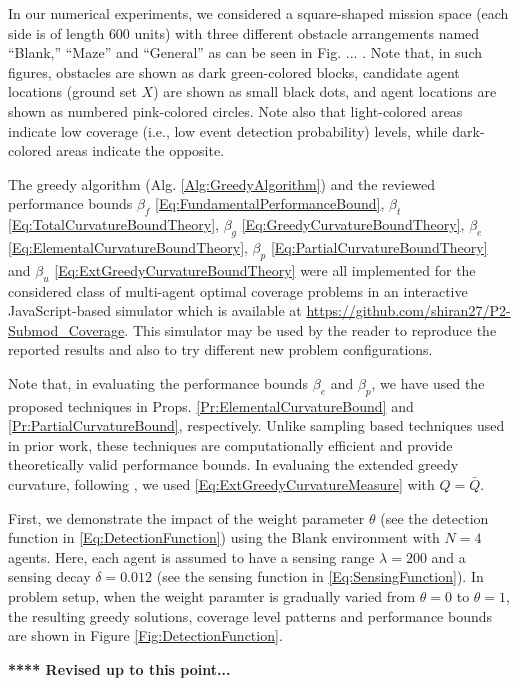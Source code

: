 \documentclass[letterpaper, 10 pt, conference]{ieeeconf}
\begin{document}
In our numerical experiments, we considered a square-shaped mission space (each side is of length $600$ units) with three different obstacle arrangements named ``Blank,'' ``Maze'' and ``General'' as can be seen in Fig. ... . Note that, in such figures, obstacles are shown as dark green-colored blocks, candidate agent locations (ground set $X$) are shown as small black dots, and agent locations are shown as numbered pink-colored circles. Note also that light-colored areas indicate low coverage (i.e., low event detection probability) levels, while dark-colored areas indicate the opposite. 

The greedy algorithm (Alg. \ref{Alg:GreedyAlgorithm}) and the reviewed performance bounds $\beta_f$ \eqref{Eq:FundamentalPerformanceBound}, $\beta_t$ \eqref{Eq:TotalCurvatureBoundTheory}, $\beta_g$ \eqref{Eq:GreedyCurvatureBoundTheory}, $\beta_e$ \eqref{Eq:ElementalCurvatureBoundTheory}, $\beta_p$ \eqref{Eq:PartialCurvatureBoundTheory} and $\beta_u$ \eqref{Eq:ExtGreedyCurvatureBoundTheory} were all implemented for the considered class of multi-agent optimal coverage problems in an interactive JavaScript-based simulator which is available at \url{https://github.com/shiran27/P2-Submod_Coverage}. This simulator may be used by the reader to reproduce the reported results and also to try different new problem configurations. 

Note that, in evaluating the performance bounds $\beta_e$ and $\beta_p$, we have used the proposed techniques in Props. \ref{Pr:ElementalCurvatureBound} and \ref{Pr:PartialCurvatureBound}, respectively. Unlike sampling based techniques used in prior work, these techniques are computationally efficient and provide theoretically valid performance bounds. In evaluaing the extended greedy curvature, following \cite{WelikalaJ02021}, we used \eqref{Eq:ExtGreedyCurvatureMeasure} with $Q=\bar{Q}$.


First, we demonstrate the impact of the weight parameter $\theta$ (see the detection function in \eqref{Eq:DetectionFunction}) using the Blank environment with $N=4$ agents. Here, each agent is assumed to have a sensing range $\lambda = 200$ and a sensing decay $\delta = 0.012$ (see the sensing function in \eqref{Eq:SensingFunction}). In problem setup, when the weight paramter is gradually varied from $\theta = 0$ to $\theta=1$, the resulting greedy solutions, coverage level patterns and performance bounds are shown in Figure \ref{Fig:DetectionFunction}. 


\bigskip
{\color{blue} \textbf{**** Revised up to this point...} }
\bigskip
\end{document}
